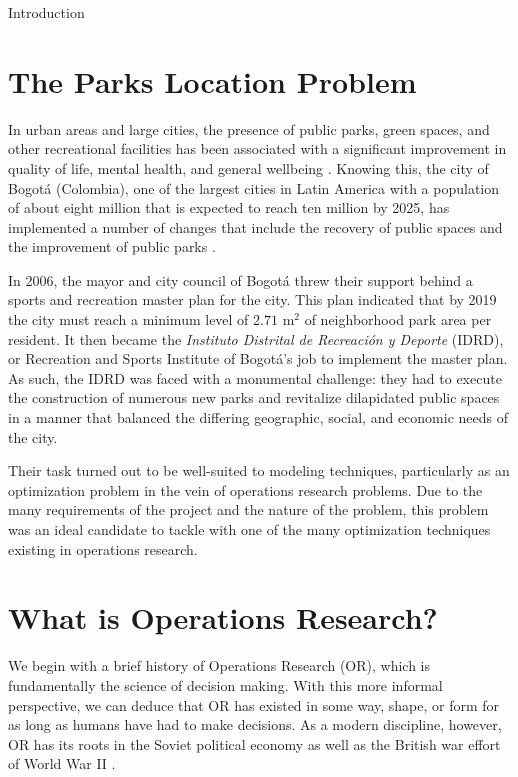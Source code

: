 \documentclass[12pt]{pom_thesis}
\theoremstyle{definition}
\begin{document}
\newpage
{}
\begin{chapter}{Introduction} \label{intro}

%
%
\section{The Parks Location Problem} \label{intro-parks-problem}

	In urban areas and large cities, the presence of public parks, green spaces, and other recreational facilities has been associated with a significant improvement in quality of life, mental health, and general wellbeing \cite{bogota}. Knowing this, the city of Bogot\'{a} (Colombia), one of the largest cities in Latin America with a population of about eight million that is expected to reach ten million by 2025, has implemented a number of changes that include the recovery of public spaces and the improvement of public parks \cite{bogota}. 
	
	In 2006, the mayor and city council of Bogot\'{a} threw their support behind a sports and recreation master plan for the city. This plan indicated that by 2019 the city must reach a minimum level of $2.71$  $\textrm{m}^2$ of neighborhood park area per resident. It then became the \textit{Instituto Distrital de Recreaci\'{o}n y Deporte} (IDRD), or Recreation and Sports Institute of Bogot\'{a}'s job to implement the master plan. As such, the IDRD was faced with a monumental challenge: they had to execute the construction of numerous new parks and revitalize dilapidated public spaces in a manner that balanced the differing geographic, social, and economic needs of the city. 
	
	Their task turned out to be well-suited to modeling techniques, particularly as an optimization problem in the vein of operations research problems. Due to the many requirements of the project and the nature of the problem, this problem was an ideal candidate to tackle with one of the many optimization techniques existing in operations research.
%
%
\section{What is Operations Research?}

We begin with a brief history of Operations Research (OR), which is fundamentally the science of decision making. With this more informal perspective, we can deduce that OR has existed in some way, shape, or form for as long as humans have had to make decisions. As a modern discipline, however, OR has its roots in the Soviet political economy as well as the British war effort of World War II \cite{or-timeline}.
%
%

\end{chapter}
\end{document}
